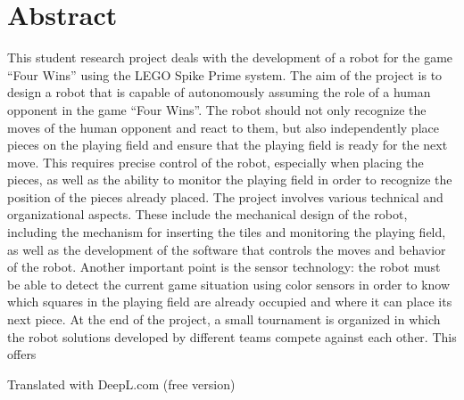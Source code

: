 \chapter*{Abstract} %
\label{cha:Abstract}
This student research project deals with the development of a robot for the game “Four Wins” using the LEGO Spike Prime system. The aim of the project is to design a robot that is capable of autonomously assuming the role of a human opponent in the game “Four Wins”. The robot should not only recognize the moves of the human opponent and react to them, but also independently place pieces on the playing field and ensure that the playing field is ready for the next move. This requires precise control of the robot, especially when placing the pieces, as well as the ability to monitor the playing field in order to recognize the position of the pieces already placed.
The project involves various technical and organizational aspects. These include the mechanical design of the robot, including the mechanism for inserting the tiles and monitoring the playing field, as well as the development of the software that controls the moves and behavior of the robot. Another important point is the sensor technology: the robot must be able to detect the current game situation using color sensors in order to know which squares in the playing field are already occupied and where it can place its next piece.
At the end of the project, a small tournament is organized in which the robot solutions developed by different teams compete against each other. This offers

Translated with DeepL.com (free version)
\clearpage